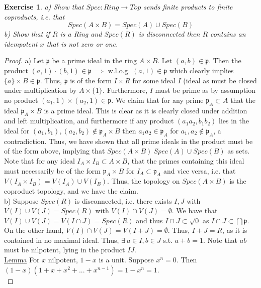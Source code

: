 \documentclass{article}
\newcommand{\fk}[1]{\mathfrak{#1}}
\newtheorem{exercise}{Exercise}
\begin{document}
\begin{exercise}
  a) Show that $Spec: Ring \to Top$  sends finite products to finite coproducts, i.e. that \[Spec(A\times B) = Spec(A) \cup Spec(B)\]
  b) Show that if $R$ is a Ring and $Spec(R)$ is disconnected then $R$ contains an idempotent $x$ that is not zero or one.
\end{exercise}
\begin{proof}
  a) Let $\fk{p}$ be a prime ideal in the ring $A \times B$. Let $(a,b) \in \fk{p}$. Then the product $(a,1) \cdot (b,1) \in \fk{p} \implies \text{ w.l.o.g. }(a,1) \in \fk{p}$ which clearly implies $\{a\} \times B \in \fk{p}$. Thus, $\fk{p}$ is of the form $I \times R$ for some ideal $I$ (ideal as must be closed under multiplication by $A\times \{1\}$. Furthermore, $I$ must be prime as by assumption no product $(a_{1},1) \times (a_{2},1) \in \fk{p}$. We claim that for any prime $\fk{p}_{A} \subset A$ that the ideal $\fk{p}_{A} \times B$ is a prime ideal. This is clear as it is clearly closed under addition and left multiplication, and furthermore if any product $(a_{1}a_{2},b_{1}b_{2})$ lies in the ideal for $(a_{1},b_{1}), (a_{2},b_{2}) \notin \fk{p}_{A} \times B$ then $a_{1}a_{2} \in \fk{p}_{A}$ for $a_{1},a_{2} \notin \fk{p}_{A}$, a contradiction. Thus, we have shown that all prime ideals in the product must be of the form above, implying that $Spec(A \times B) \ Spec(A) \cup Spec(B)$ as sets. Note that for any ideal $I_{A} \times I_{B} \subset A\times B$, that the primes containing this ideal must necessarily be of the form $\fk{p}_{A} \times B$ for $I_{A} \subset \fk{p}_{A}$ and vice versa, i.e. that $V(I_{A} \times I_{B}) = V(I_{A}) \cup V(I_{B})$. Thus, the topology on $Spec(A \times B)$ is the coproduct topology, and we have the claim. \\

  b) Suppose $Spec(R)$ is disconnected, i.e. there exists $I, J$ with $V(I) \cup V(J) = Spec(R)$ with $V(I) \cap V(J) = \emptyset$. We have that $V(I) \cup V(J) = V(I \cap J) = Spec(R)$ and thus $I \cap J \subset \sqrt{0}$ as $I\cap J \subset \bigcap \fk{p}$. On the other hand, $V(I) \cap V(J) = V(I + J) = \emptyset$. Thus, $I+J = R$, as it is contained in no maximal ideal. Thus, $\exists \ a \in I, b \in J$ s.t. $a + b = 1$. Note that $ab$ must be nilpotent, lying in the product $IJ$. \\
  
  \underline{Lemma} For $x$ nilpotent, $1-x$ is a unit. Suppose $x^{n} = 0$. Then $(1-x)(1+x+x^{2}+...+x^{n-1}) = 1 - x^{n} = 1$. \\


\end{proof}
\end{document}
